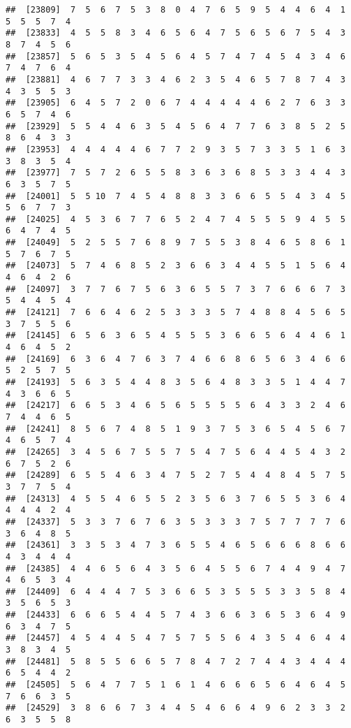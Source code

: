 \documentclass[
]{book}
\begin{document}
\begin{verbatim}
##  [23809]  7  5  6  7  5  3  8  0  4  7  6  5  9  5  4  4  6  4  1  5  5  5  7  4
##  [23833]  4  5  5  8  3  4  6  5  6  4  7  5  6  5  6  7  5  4  3  8  7  4  5  6
##  [23857]  5  6  5  3  5  4  5  6  4  5  7  4  7  4  5  4  3  4  6  7  4  7  6  4
##  [23881]  4  6  7  7  3  3  4  6  2  3  5  4  6  5  7  8  7  4  3  4  3  5  5  3
##  [23905]  6  4  5  7  2  0  6  7  4  4  4  4  4  6  2  7  6  3  3  6  5  7  4  6
##  [23929]  5  5  4  4  6  3  5  4  5  6  4  7  7  6  3  8  5  2  5  8  6  4  3  3
##  [23953]  4  4  4  4  4  6  7  7  2  9  3  5  7  3  3  5  1  6  3  3  8  3  5  4
##  [23977]  7  5  7  2  6  5  5  8  3  6  3  6  8  5  3  3  4  4  3  6  3  5  7  5
##  [24001]  5  5 10  7  4  5  4  8  8  3  3  6  6  5  5  4  3  4  5  5  6  7  7  3
##  [24025]  4  5  3  6  7  7  6  5  2  4  7  4  5  5  5  9  4  5  5  6  4  7  4  5
##  [24049]  5  2  5  5  7  6  8  9  7  5  5  3  8  4  6  5  8  6  1  5  7  6  7  5
##  [24073]  5  7  4  6  8  5  2  3  6  6  3  4  4  5  5  1  5  6  4  4  6  4  2  6
##  [24097]  3  7  7  6  7  5  6  3  6  5  5  7  3  7  6  6  6  7  3  5  4  4  5  4
##  [24121]  7  6  6  4  6  2  5  3  3  3  5  7  4  8  8  4  5  6  5  3  7  5  5  6
##  [24145]  6  5  6  3  6  5  4  5  5  5  3  6  6  5  6  4  4  6  1  4  6  4  5  2
##  [24169]  6  3  6  4  7  6  3  7  4  6  6  8  6  5  6  3  4  6  6  5  2  5  7  5
##  [24193]  5  6  3  5  4  4  8  3  5  6  4  8  3  3  5  1  4  4  7  4  3  6  6  5
##  [24217]  6  6  5  3  4  6  5  6  5  5  5  5  6  4  3  3  2  4  6  7  4  4  6  5
##  [24241]  8  5  6  7  4  8  5  1  9  3  7  5  3  6  5  4  5  6  7  4  6  5  7  4
##  [24265]  3  4  5  6  7  5  5  7  5  4  7  5  6  4  4  5  4  3  2  6  7  5  2  6
##  [24289]  6  5  5  4  6  3  4  7  5  2  7  5  4  4  8  4  5  7  5  3  7  7  5  4
##  [24313]  4  5  5  4  6  5  5  2  3  5  6  3  7  6  5  5  3  6  4  4  4  4  2  4
##  [24337]  5  3  3  7  6  7  6  3  5  3  3  3  7  5  7  7  7  7  6  3  6  4  8  5
##  [24361]  3  3  5  3  4  7  3  6  5  5  4  6  5  6  6  6  8  6  6  4  3  4  4  4
##  [24385]  4  4  6  5  6  4  3  5  6  4  5  5  6  7  4  4  9  4  7  4  6  5  3  4
##  [24409]  6  4  4  4  7  5  3  6  6  5  3  5  5  5  3  3  5  8  4  3  5  6  5  3
##  [24433]  6  6  6  5  4  4  5  7  4  3  6  6  3  6  5  3  6  4  9  6  3  4  7  5
##  [24457]  4  5  4  4  5  4  7  5  7  5  5  6  4  3  5  4  6  4  4  3  8  3  4  5
##  [24481]  5  8  5  5  6  6  5  7  8  4  7  2  7  4  4  3  4  4  4  6  5  4  4  2
##  [24505]  5  6  4  7  7  5  1  6  1  4  6  6  6  5  6  4  6  4  5  7  6  6  3  5
##  [24529]  3  8  6  6  7  3  4  4  5  4  6  6  4  9  6  2  3  3  2  6  3  5  5  8

\end{verbatim}
\end{document}
